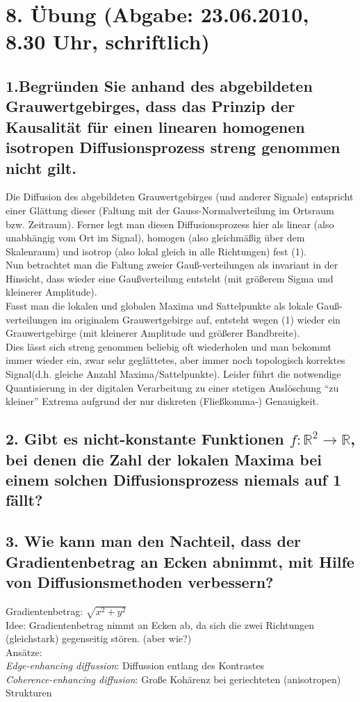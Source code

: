 \section*{8. \"Ubung (Abgabe: 23.06.2010, 8.30 Uhr, schriftlich)}

\subsection*{1.Begr\"unden Sie anhand des abgebildeten Grauwertgebirges, dass das Prinzip der Kausalit\"at f\"ur einen linearen homogenen isotropen Diffusionsprozess streng genommen nicht gilt.}

Die Diffusion des abgebildeten Grauwertgebirges (und anderer Signale) entspricht einer Gl\"attung dieser (Faltung mit der Gauss-Normalverteilung im Ortsraum bzw. Zeitraum). Ferner legt man diesen Diffusionsprozess hier als linear (also unabh\"angig vom Ort im Signal), homogen (also gleichm\"a{\ss}ig \"uber dem Skalenraum) und isotrop (also lokal gleich in alle Richtungen) fest (1). \\
Nun betrachtet man die Faltung zweier Gau{\ss}-verteilungen als invariant in der Hinsicht, dass wieder eine Gau{\ss}verteilung entsteht (mit gr\"o{\ss}erem Sigma und kleinerer Amplitude). \\
Fasst man die lokalen und globalen Maxima und Sattelpunkte als lokale Gau{\ss}-verteilungen im originalem Grauwertgebirge auf, entsteht wegen (1) wieder ein Grauwertgebirge (mit kleinerer Amplitude und gr\"o{\ss}erer Bandbreite). \\
Dies l\"asst sich streng genommen beliebig oft wiederholen und man bekommt immer wieder ein, zwar sehr gegl\"attetes, aber immer noch topologisch korrektes  Signal(d.h. gleiche Anzahl Maxima/Sattelpunkte). Leider f\"uhrt die notwendige Quantisierung in der digitalen Verarbeitung zu einer stetigen Ausl\"oschung ``zu kleiner'' Extrema aufgrund der nur diskreten (Flie{\ss}komma-) Genauigkeit.

\subsection*{2. Gibt es nicht-konstante Funktionen $f: \mathbb{R}^{2} \rightarrow \mathbb{R}$, bei denen die Zahl der lokalen Maxima bei einem solchen Diffusionsprozess niemals auf 1 f\"allt?}

\subsection*{3. Wie kann man den Nachteil, dass der Gradientenbetrag an Ecken abnimmt, mit Hilfe von  Diffusionsmethoden verbessern?}
Gradientenbetrag: $\sqrt{x^{2}+y^{2}}$ \\
Idee: Gradientenbetrag nimmt an Ecken ab, da sich die zwei Richtungen (gleichstark) gegenseitig st\"oren. (aber wie?) \\
Ans\"atze:  \\
\emph{Edge-enhancing diffussion}: Diffussion entlang des Kontrastes \\
\emph{Coherence-enhancing diffusion}: Gro{\ss}e Koh\"arenz bei geriechteten (anisotropen) Strukturen